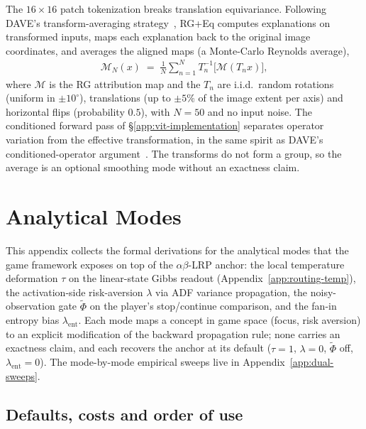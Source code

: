 \documentclass[twoside]{article}
\newcommand{\1}{\mathbf{1}}
\begin{document}
The $16{\times}16$ patch tokenization breaks translation equivariance. Following DAVE's
transform-averaging strategy~\citep{Wrobel2024}, \ac{RG}+Eq computes explanations on transformed
inputs, maps each explanation back to the original image coordinates, and averages the aligned maps
(a Monte-Carlo Reynolds average),
\begin{align}\label{eq:equivariant-average}
    \mathcal{M}_N(x) \;=\; \frac{1}{N}\sum_{n=1}^{N} T_n^{-1}\bigl[\mathcal{M}(T_n x)\bigr],
\end{align}
where $\mathcal{M}$ is the \ac{RG} attribution map and the $T_n$ are i.i.d.\ random rotations
(uniform in $\pm 10^\circ$), translations (up to $\pm 5\%$ of the image extent per axis) and
horizontal flips (probability $0.5$), with $N = 50$ and no input noise. The conditioned forward
pass of \S\ref{app:vit-implementation} separates operator variation from the effective
transformation, in the same spirit as DAVE's conditioned-operator argument~\citep{Wrobel2024}. The
transforms do not form a group, so the average is an optional smoothing mode without an exactness
claim.
\newpage
\section{Analytical Modes}\label{app:modes}

This appendix collects the formal derivations for the analytical modes that the game framework
exposes on top of the $\alpha\beta$-\ac{LRP} anchor: the local temperature deformation $\tau$ on
the linear-state Gibbs readout (Appendix~\ref{app:routing-temp}), the activation-side risk-aversion
$\lambda$ via \ac{ADF} variance propagation, the noisy-observation gate $\tilde\Phi$ on the
player's stop/continue comparison, and the fan-in entropy bias $\lambda_{\mathrm{ent}}$. Each mode
maps a concept in game space (focus, risk aversion) to an explicit modification of the backward
propagation rule; none carries an exactness claim, and each recovers the anchor at its default
($\tau = 1$, $\lambda = 0$, $\tilde\Phi$ off, $\lambda_{\mathrm{ent}} = 0$). The mode-by-mode
empirical sweeps live in Appendix~\ref{app:dual-sweeps}.

\subsection{Defaults, costs and order of use}\label{app:mode-guide}
\end{document}
